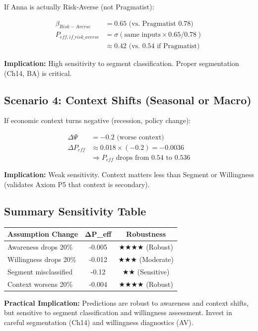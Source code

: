 If Anna is actually Risk-Averse (not Pragmatist):

\begin{align}
\beta_{Risk-Averse} &= 0.65 \text{ (vs. Pragmatist } 0.78) \\
P_{eff,if\_risk\_averse} &= \sigma(\text{same inputs} \times 0.65 / 0.78) \\
&\approx 0.42 \text{ (vs. 0.54 if Pragmatist)}
\end{align}

\textbf{Implication:} High sensitivity to segment classification. Proper segmentation (Ch14, BA) is critical.

\subsection{Scenario 4: Context Shifts (Seasonal or Macro)}

If economic context turns negative (recession, policy change):

\begin{align}
\Delta \Psi &= -0.2 \text{ (worse context)} \\
\Delta P_{eff} &\approx 0.018 \times (-0.2) = -0.0036 \\
&\Rightarrow P_{eff} \text{ drops from } 0.54 \text{ to } 0.536
\end{align}

\textbf{Implication:} Weak sensitivity. Context matters less than Segment or Willingness (validates Axiom P5 that context is secondary).

\subsection{Summary Sensitivity Table}

\begin{center}
\begin{tabular}{|l|c|c|}
\hline
\textbf{Assumption Change} & \textbf{ΔP\_eff} & \textbf{Robustness} \\
\hline
Awareness drops 20\% & -0.005 & ★★★★ (Robust) \\
Willingness drops 20\% & -0.012 & ★★★ (Moderate) \\
Segment misclassified & -0.12 & ★★ (Sensitive) \\
Context worsens 20\% & -0.004 & ★★★★ (Robust) \\
\hline
\end{tabular}
\end{center}

\textbf{Practical Implication:} Predictions are robust to awareness and context shifts, but sensitive to segment classification and willingness assessment. Invest in careful segmentation (Ch14) and willingness diagnostics (AV).

